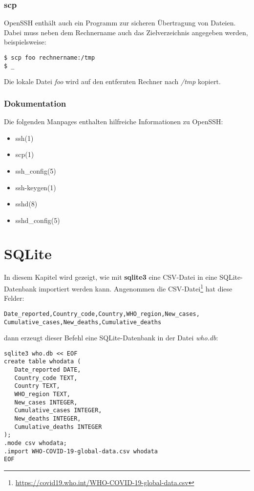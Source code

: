 \documentclass[titlepage,a4paper]{article}
\begin{document}
\subsubsection*{scp}

OpenSSH enthält auch ein Programm zur sicheren Übertragung von Dateien.
Dabei muss neben dem Rechnername auch das Zielverzeichnis angegeben werden, 
beispielsweise:

\begin{verbatim}
$ scp foo rechnername:/tmp
$ _
\end{verbatim}

\noindent
Die lokale Datei \emph{foo} wird auf den entfernten Rechner nach \emph{/tmp} kopiert.

\subsubsection*{Dokumentation}

Die folgenden Manpages enthalten hilfreiche Informationen zu OpenSSH:

\begin{itemize}
\setlength{\itemsep}{0pt}
\item ssh(1)
\item scp(1)
\item ssh\_config(5)
\item ssh-keygen(1)
\item sshd(8)
\item sshd\_config(5)
\end{itemize}

\section{SQLite}
\label{sec:sqlite}

In diesem Kapitel wird gezeigt, wie mit \textbf{sqlite3} eine CSV-Datei
in eine SQLite-Datenbank importiert werden kann.
Angenommen die
CSV-Datei\footnote{\url{https://covid19.who.int/WHO-COVID-19-global-data.csv}}
hat diese Felder:

\begin{verbatim}
Date_reported,Country_code,Country,WHO_region,New_cases,
Cumulative_cases,New_deaths,Cumulative_deaths
\end{verbatim}

\noindent
dann erzeugt dieser Befehl eine SQLite-Datenbank in der Datei \emph{who.db}:

\begin{verbatim}
sqlite3 who.db << EOF
create table whodata (
   Date_reported DATE,
   Country_code TEXT,
   Country TEXT,
   WHO_region TEXT,
   New_cases INTEGER,
   Cumulative_cases INTEGER,
   New_deaths INTEGER,
   Cumulative_deaths INTEGER
);
.mode csv whodata;
.import WHO-COVID-19-global-data.csv whodata
EOF
\end{verbatim}
\end{document}
